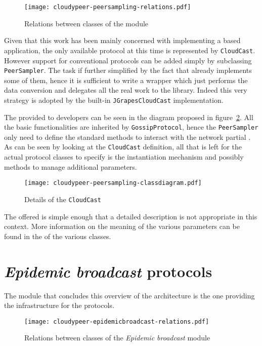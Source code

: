 \begin{figure}[h!]
  \centering
  \texttt{[image: cloudypeer-peersampling-relations.pdf]}
  \caption{Relations between classes of the \peersampling module}
  \label{fig:cloudypeer-peersampling-relations}
\end{figure}

Given that this work has been mainly concerned with implementing a
\cloudcast based application, the only available protocol at this time
is represented by \texttt{CloudCast}. However support for
conventional protocols can be added simply by subclassing
\texttt{PeerSampler}. The task if further simplified by the fact that
\grapes already implements some of them, hence it is sufficient to
write a wrapper which just performs the data conversion and delegates
all the real work to the library. Indeed this very strategy is adopted
by the built-in \texttt{JGrapesCloudCast} implementation.

The \api provided to developers can be seen in the diagram proposed in
figure~\ref{fig:cloudypeer-peersampling-class}. All the basic
functionalities are inherited by \texttt{GossipProtocol}, hence the
\texttt{PeerSampler} only need to define the standard methods to
interact with the network partial \view. As can be seen by looking at
the \texttt{CloudCast} definition, all that is left for the actual
protocol classes to specify is the instantiation mechanism and
possibly methods to manage additional parameters.

\begin{figure}[h!]
  \hspace{-50pt}
  \texttt{[image: cloudypeer-peersampling-classdiagram.pdf]}
  \caption{Details of the \texttt{CloudCast} \api}
  \label{fig:cloudypeer-peersampling-class}
\end{figure}

The offered \api is simple enough that a detailed description is not
appropriate in this context. More information on the meaning of the
various parameters can be found in the \javadoc of the various
classes.

\section{\emph{Epidemic broadcast} protocols}
The module that concludes this overview of the \cloudypeer
architecture is the one providing the infrastructure for the \epidemic
protocols.

\begin{figure}[h!]
  \centering
  \texttt{[image: cloudypeer-epidemicbroadcast-relations.pdf]}
  \caption{Relations between classes of the \textit{Epidemic
      broadcast} module}
  \label{fig:cloudypeer-epidemicbroadcast-relations}
\end{figure}

